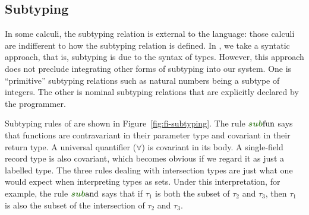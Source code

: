 \subsection{Subtyping}






In some calculi, the subtyping relation is external to the language: those
calculi are indifferent to how the subtyping relation is defined. In \name, we
take a syntatic approach, that is, subtyping is due to the syntax of types.
However, this approach does not preclude integrating other forms of subtyping
into our system. One is ``primitive'' subtyping relations such as natural
numbers being a subtype of integers. The other is nominal subtyping relations
that are explicitly declared by the programmer.

\begin{figure*}[h]
  
  \caption{Subtyping in \name.}
  \label{fig:fi-subtyping}
\end{figure*}

Subtyping rules of \name are shown in Figure~\ref{fig:fi-subtyping}. The rule
$\rulelabelsubfun$ says that functions are contravariant in their parameter type
and covariant in their return type. A universal quantifier ($\forall$) is
covariant in its body. A single-field record type is also covariant, which
becomes obvious if we regard it as just a labelled type. The three rules dealing
with intersection types are just what one would expect when interpreting types
as sets. Under this interpretation, for example, the rule $\rulelabelsuband$
says that if $\tau_1$ is both the subset of $\tau_2$ and $\tau_3$, then $\tau_1$
is also the subset of the intersection of $\tau_2$ and $\tau_3$.

